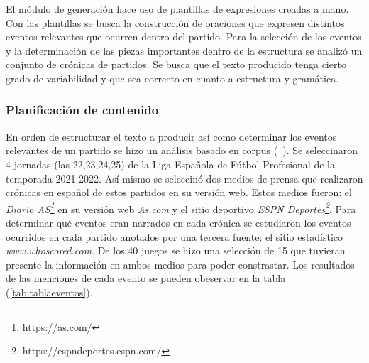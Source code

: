     El módulo de generación hace uso de plantillas de expresiones creadas a mano. Con las plantillas se busca la 
construcción de oraciones que expresen distintos eventos relevantes que ocurren dentro del partido. Para la selección de 
los eventos y la determinación de las piezas importantes dentro de la estructura se analizó un conjunto de crónicas de partidos. 
Se busca que el texto producido tenga cierto grado de variabilidad y que sea correcto en cuanto a estructura y gramática.


\subsubsection{Planificación de contenido}

    En orden de estructurar el texto a producir así como determinar los eventos relevantes de un partido se hizo un análisis basado en 
corpus (~\cite{reiter_dale_2000}). Se seleccinaron 4 jornadas (las 22,23,24,25) de la Liga Española de Fútbol Profesional de la temporada 
2021-2022. Así mismo se seleccinó dos medios de prensa que realizaron crónicas en español de estos partidos en su versión web. Estos medios 
fueron: el \textit{Diario AS\footnote[1]{https://as.com/}} en su versión web \textit{As.com} y el sitio deportivo 
\textit{ESPN Deportes\footnote[2]{https://espndeportes.espn.com/}}. Para determinar qué eventos eran narrados en cada crónica se 
estudiaron los eventos ocurridos en cada partido anotados por una tercera fuente: el sitio estadístico \textit{www.whoscored.com}. 
De los 40 juegos se hizo una selección de 15 que tuvieran presente la información en ambos medios para poder constrastar. Los resultados de las 
menciones de cada evento se pueden obeservar en la tabla (\ref{tab:tablaeventos}).\\

